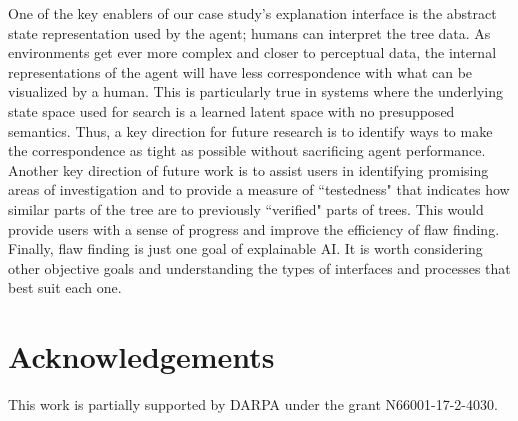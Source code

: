 \documentclass{article}
\begin{document}
One of the key enablers of our case study's explanation interface is the abstract state representation used by the agent; humans can interpret the tree data. As environments get ever more complex and closer to perceptual data, the internal representations of the agent will have less correspondence with what can be visualized by a human. This is particularly true in systems where the underlying state space used for search is a learned latent space with no presupposed semantics. Thus, a key direction for future research is to identify ways to make the correspondence as tight as possible without sacrificing agent performance. Another key direction of future work is to assist users in identifying promising areas of investigation and to provide a measure of ``testedness" that indicates how similar parts of the tree are to previously ``verified" parts of trees. This would provide users with a sense of progress and improve the efficiency of flaw finding. Finally, flaw finding is just one goal of explainable AI. It is worth considering other objective goals and understanding the types of interfaces and processes that best suit each one. 

\section{Acknowledgements}
This work is partially supported by DARPA under the grant N66001-17-2-4030.


 
\end{document}
